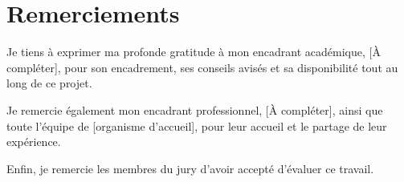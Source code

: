 \chapter*{Remerciements}


Je tiens \`a exprimer ma profonde gratitude \`a mon encadrant acad\'emique,
[\`A compl\'eter], pour son encadrement, ses conseils avis\'es et sa
disponibilit\'e tout au long de ce projet.

Je remercie \'egalement mon encadrant professionnel, [\`A compl\'eter],
ainsi que toute l'\'equipe de [organisme d'accueil], pour leur accueil et
le partage de leur exp\'erience.

Enfin, je remercie les membres du jury d'avoir accept\'e d'\'evaluer ce travail.

\clearpage
